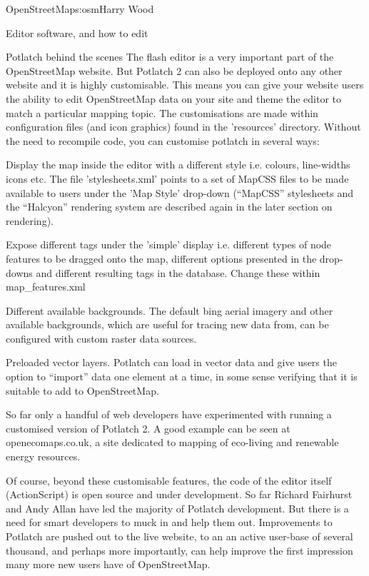 \begin{aosachapter}{OpenStreetMap}{s:osm}{Harry Wood}
\begin{aosasect1}{Editor software, and how to edit}
\begin{aosasect2}{Potlatch behind the scenes}
The flash editor is a very important part of the OpenStreetMap
website. But Potlatch 2 can also be deployed onto any other website
and it is highly customisable. This means you can give your website
users the ability to edit OpenStreetMap data on your site and theme
the editor to match a particular mapping topic. The customisations are
made within configuration files (and icon graphics) found in the
'resources' directory. Without the need to recompile code, you can
customise potlatch in several ways:

\begin{aosaitemize}

\item Display the map inside the editor with a different style
  i.e. colours, line-widths icons etc. The file 'stylesheets.xml'
  points to a set of MapCSS files to be made available to users under
  the 'Map Style' drop-down (``MapCSS'' stylesheets and the
  ``Halcyon'' rendering system are described again in the later
  section on rendering).

\item Expose different tags under the 'simple' display i.e. different
  types of node features to be dragged onto the map, different options
  presented in the drop-downs and different resulting tags in the
  database. Change these within map\_features.xml

\item Different available backgrounds. The default bing aerial imagery
  and other available backgrounds, which are useful for tracing new
  data from, can be configured with custom raster data sources.

\item Preloaded vector layers. Potlatch can load in vector data and
  give users the option to ``import'' data one element at a time, in
  some sense verifying that it is suitable to add to OpenStreetMap.

\end{aosaitemize}

So far only a handful of web developers have experimented with running
a customised version of Potlatch 2. A good example can be seen at
openecomaps.co.uk, a site dedicated to mapping of eco-living and
renewable energy resources.

Of course, beyond these customisable features, the code of the editor
itself (ActionScript) is open source and under development. So far
Richard Fairhurst and Andy Allan have led the majority of Potlatch
development. But there is a need for smart developers to muck in and
help them out. Improvements to Potlatch are pushed out to the live
website, to an an active user-base of several thousand, and perhaps
more importantly, can help improve the first impression many more new
users have of OpenStreetMap.


\end{aosasect2}
\end{aosasect1}
\end{aosachapter}
